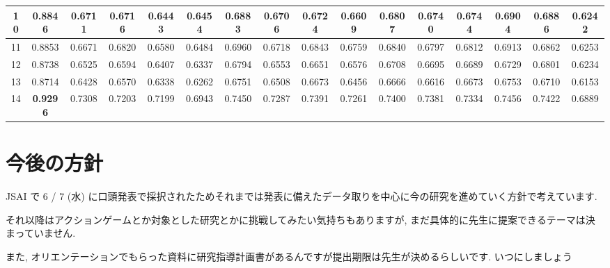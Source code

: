 \documentclass{jarticle}     %
\begin{document}
\begin{table}[t]
{\begin{tabular}{|c|c|c|c|c|c|c|c|c|c|c|c|c|c|c|c|}
        \multicolumn{1}{|c|}{10} & 0.8846 & 0.6711 & 0.6716 & 0.6443 & 0.6454 & 0.6883 & 0.6706 & 0.6724 & 0.6609 & 0.6807 & 0.6740 & 0.6744 & 0.6904 & 0.6886 & 0.6242 \\ \hline
        \multicolumn{1}{|c|}{11} & 0.8853 & 0.6671 & 0.6820 & 0.6580 & 0.6484 & 0.6960 & 0.6718 & 0.6843 & 0.6759 & 0.6840 & 0.6797 & 0.6812 & 0.6913 & 0.6862 & 0.6253 \\ \hline
        \multicolumn{1}{|c|}{12} & 0.8738 & 0.6525 & 0.6594 & 0.6407 & 0.6337 & 0.6794 & 0.6553 & 0.6651 & 0.6576 & 0.6708 & 0.6695 & 0.6689 & 0.6729 & 0.6801 & 0.6234 \\ \hline
        \multicolumn{1}{|c|}{13} & 0.8714 & 0.6428 & 0.6570 & 0.6338 & 0.6262 & 0.6751 & 0.6508 & 0.6673 & 0.6456 & 0.6666 & 0.6616 & 0.6673 & 0.6753 & 0.6710 & 0.6153 \\ \hline
        \multicolumn{1}{|c|}{14} & \textbf{0.9296} & 0.7308 & 0.7203 & 0.7199 & 0.6943 & 0.7450 & 0.7287 & 0.7391 & 0.7261 & 0.7400 & 0.7381 & 0.7334 & 0.7456 & 0.7422 & 0.6889 \\ \hline
        \end{tabular}
    }
      \end{table}

\section{今後の方針}
JSAI で 6 / 7 (水) に口頭発表で採択されたためそれまでは発表に備えたデータ取りを中心に今の研究を進めていく方針で考えています.  
\par
それ以降はアクションゲームとか対象とした研究とかに挑戦してみたい気持ちもありますが, まだ具体的に先生に提案できるテーマは決まっていません.
\par
また, オリエンテーションでもらった資料に研究指導計画書があるんですが提出期限は先生が決めるらしいです. いつにしましょう




\end{document}
